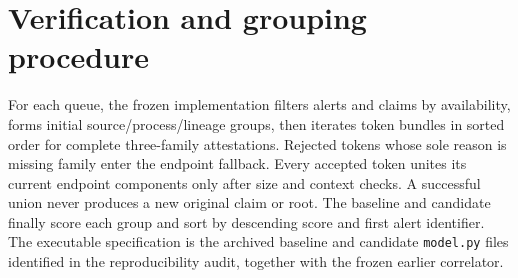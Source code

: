 \section{Verification and grouping procedure}
For each queue, the frozen implementation filters alerts and claims by availability, forms initial source/process/lineage groups, then iterates token bundles in sorted order for complete three-family attestations. Rejected tokens whose sole reason is missing family enter the endpoint fallback. Every accepted token unites its current endpoint components only after size and context checks. A successful union never produces a new original claim or root. The baseline and candidate finally score each group and sort by descending score and first alert identifier. The executable specification is the archived baseline and candidate \texttt{model.py} files identified in the reproducibility audit, together with the frozen earlier correlator.
